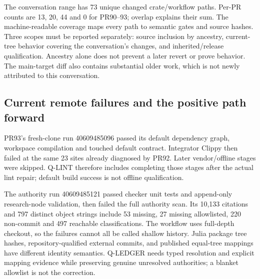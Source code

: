 \documentclass[aps,pra,reprint,onecolumn,10pt,notitlepage,nofootinbib]{revtex4-2}
\begin{document}
The conversation range has 73 unique changed crate/workflow paths. Per-PR
counts are 13, 20, 44 and 0 for PR90--93; overlap explains their sum.
The machine-readable coverage maps every path to semantic gates and source
hashes. Three scopes must be reported separately: source inclusion by ancestry,
current-tree behavior covering the conversation's changes, and inherited/release
qualification. Ancestry alone does not prevent a later revert or prove behavior.
The main-target diff also contains substantial older work, which is not newly
attributed to this conversation.

\subsection{Current remote failures and the positive path forward}

PR93's fresh-clone run 40609485096 passed its default dependency graph,
workspace compilation and touched default contract. Integrator Clippy then
failed at the same 23 sites already diagnosed by PR92. Later vendor/offline
stages were skipped. Q-LINT therefore includes completing those stages after
the actual lint repair; default build success is not offline qualification.

The authority run 40609485121 passed checker unit tests and append-only
research-node validation, then failed the full authority scan. Its 10,133
citations and 797 distinct object strings include 53 missing, 27 missing
allowlisted, 220 non-commit and 497 reachable classifications. The workflow
uses full-depth checkout, so the failures cannot all be called shallow history.
Julia package tree hashes, repository-qualified external commits, and
published equal-tree mappings have different identity semantics. Q-LEDGER
needs typed resolution and explicit mapping evidence while preserving genuine
unresolved authorities; a blanket allowlist is not the correction.
\end{document}
